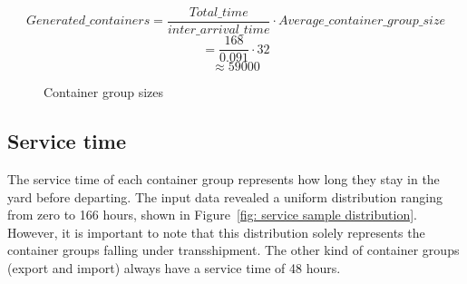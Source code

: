 \documentclass{article}
\begin{document}
\begin{equation}
    Generated\_containers = \frac{Total\_time}{inter\_arrival\_time} \cdot Average\_container\_group\_size \end{equation}
\begin{equation} = \frac{168}{0.091} \cdot 32 \end{equation}
\begin{equation} \approx 59000 \end{equation}

\begin{figure}[!tbp]
    \centering
    \hfill
    \caption{Container group sizes}
\end{figure}

\subsection{Service time}
The service time of each container group represents how long they stay in the
yard before departing. The input data revealed a uniform distribution ranging
from zero to 166 hours, shown in Figure~\ref{fig: service sample distribution}.
However, it is important to note that this distribution solely represents the
container groups falling under transshipment. The other kind of container
groups (export and import) always have a service time of 48 hours.
\end{document}
